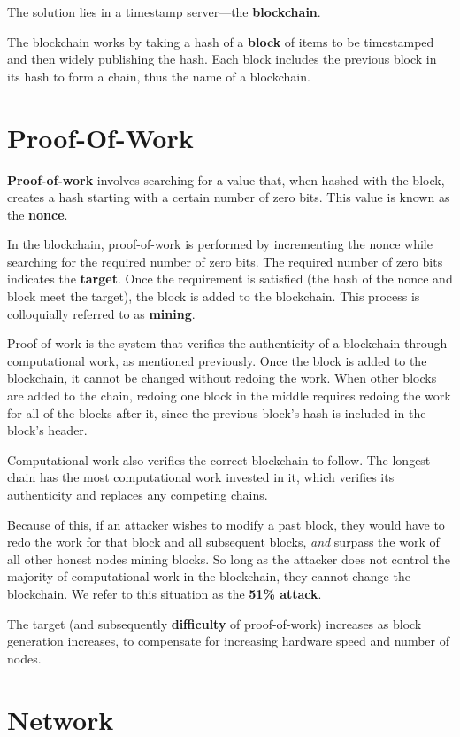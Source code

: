 \documentclass[11pt, letterpaper]{template}
\begin{document}
The solution lies in a timestamp server---the \textbf{blockchain}.

The blockchain works by taking a hash of a \textbf{block} of items to be timestamped and then widely publishing the hash. Each block includes the previous block in its hash to form a chain, thus the name of a blockchain.

\section{Proof-Of-Work}

\textbf{Proof-of-work} involves searching for a value that, when hashed with the block, creates a hash starting with a certain number of zero bits. This value is known as the \textbf{nonce}.

In the blockchain, proof-of-work is performed by incrementing the nonce while searching for the required number of zero bits. The required number of zero bits indicates the \textbf{target}. Once the requirement is satisfied (the hash of the nonce and block meet the target), the block is added to the blockchain. This process is colloquially referred to as \textbf{mining}.

Proof-of-work is the system that verifies the authenticity of a blockchain through computational work, as mentioned previously. Once the block is added to the blockchain, it cannot be changed without redoing the work. When other blocks are added to the chain, redoing one block in the middle requires redoing the work for all of the blocks after it, since the previous block's hash is included in the block's header.

Computational work also verifies the correct blockchain to follow. The longest chain has the most computational work invested in it, which verifies its authenticity and replaces any competing chains. 

Because of this, if an attacker wishes to modify a past block, they would have to redo the work for that block and all subsequent blocks, \emph{and} surpass the work of all other honest nodes mining blocks. So long as the attacker does not control the majority of computational work in the blockchain, they cannot change the blockchain. We refer to this situation as the \textbf{51\% attack}.

The target (and subsequently \textbf{difficulty} of proof-of-work) increases as block generation increases, to compensate for increasing hardware speed and number of nodes.

\section{Network}
\end{document}

